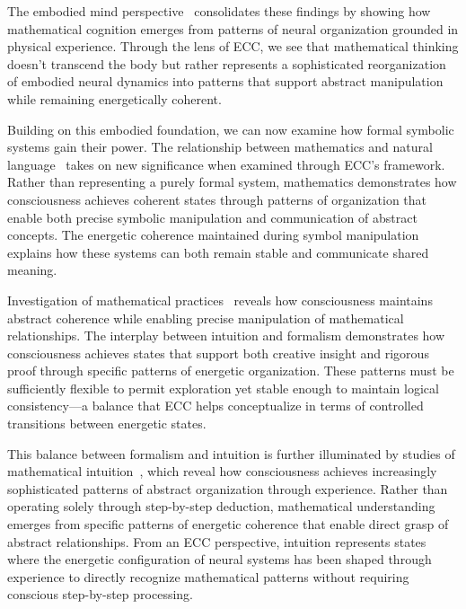 The embodied mind perspective~\cite{Varela1991, van2025processes} consolidates these findings by showing how mathematical cognition emerges from patterns of neural organization grounded in physical experience. Through the lens of ECC, we see that mathematical thinking doesn't transcend the body but rather represents a sophisticated reorganization of embodied neural dynamics into patterns that support abstract manipulation while remaining energetically coherent.

Building on this embodied foundation, we can now examine how formal symbolic systems gain their power. The relationship between mathematics and natural language~\cite{MacLane1986, zheng2025unbearable} takes on new significance when examined through ECC's framework. Rather than representing a purely formal system, mathematics demonstrates how consciousness achieves coherent states through patterns of organization that enable both precise symbolic manipulation and communication of abstract concepts. The energetic coherence maintained during symbol manipulation explains how these systems can both remain stable and communicate shared meaning.

Investigation of mathematical practices~\cite{Rotman1993, hunt2024electromagnetic} reveals how consciousness maintains abstract coherence while enabling precise manipulation of mathematical relationships. The interplay between intuition and formalism demonstrates how consciousness achieves states that support both creative insight and rigorous proof through specific patterns of energetic organization. These patterns must be sufficiently flexible to permit exploration yet stable enough to maintain logical consistency—a balance that ECC helps conceptualize in terms of controlled transitions between energetic states.

This balance between formalism and intuition is further illuminated by studies of mathematical intuition~\cite{Penrose1994, da2024mathematical, Barrow1992}, which reveal how consciousness achieves increasingly sophisticated patterns of abstract organization through experience. Rather than operating solely through step-by-step deduction, mathematical understanding emerges from specific patterns of energetic coherence that enable direct grasp of abstract relationships. From an ECC perspective, intuition represents states where the energetic configuration of neural systems has been shaped through experience to directly recognize mathematical patterns without requiring conscious step-by-step processing.

